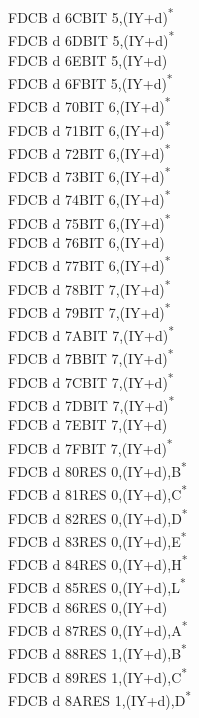 \documentclass[twoside,openright,a4paper]{book}
\begin{document}
\begin{multicols}{3}
{\begin{tabbing}
	FDCB d 6C\>BIT 5,(IY+d)\textsuperscript{*}\\
	FDCB d 6D\>BIT 5,(IY+d)\textsuperscript{*}\\
	FDCB d 6E\>BIT 5,(IY+d)\\
	FDCB d 6F\>BIT 5,(IY+d)\textsuperscript{*}\\
	FDCB d 70\>BIT 6,(IY+d)\textsuperscript{*}\\
	FDCB d 71\>BIT 6,(IY+d)\textsuperscript{*}\\
	FDCB d 72\>BIT 6,(IY+d)\textsuperscript{*}\\
	FDCB d 73\>BIT 6,(IY+d)\textsuperscript{*}\\
	FDCB d 74\>BIT 6,(IY+d)\textsuperscript{*}\\
	FDCB d 75\>BIT 6,(IY+d)\textsuperscript{*}\\
	FDCB d 76\>BIT 6,(IY+d)\\
	FDCB d 77\>BIT 6,(IY+d)\textsuperscript{*}\\
	FDCB d 78\>BIT 7,(IY+d)\textsuperscript{*}\\
	FDCB d 79\>BIT 7,(IY+d)\textsuperscript{*}\\
	FDCB d 7A\>BIT 7,(IY+d)\textsuperscript{*}\\
	FDCB d 7B\>BIT 7,(IY+d)\textsuperscript{*}\\
	FDCB d 7C\>BIT 7,(IY+d)\textsuperscript{*}\\
	FDCB d 7D\>BIT 7,(IY+d)\textsuperscript{*}\\
	FDCB d 7E\>BIT 7,(IY+d)\\
	FDCB d 7F\>BIT 7,(IY+d)\textsuperscript{*}\\
	FDCB d 80\>RES 0,(IY+d),B\textsuperscript{*}\\
	FDCB d 81\>RES 0,(IY+d),C\textsuperscript{*}\\
	FDCB d 82\>RES 0,(IY+d),D\textsuperscript{*}\\
	FDCB d 83\>RES 0,(IY+d),E\textsuperscript{*}\\
	FDCB d 84\>RES 0,(IY+d),H\textsuperscript{*}\\
	FDCB d 85\>RES 0,(IY+d),L\textsuperscript{*}\\
	FDCB d 86\>RES 0,(IY+d)\\
	FDCB d 87\>RES 0,(IY+d),A\textsuperscript{*}\\
	FDCB d 88\>RES 1,(IY+d),B\textsuperscript{*}\\
	FDCB d 89\>RES 1,(IY+d),C\textsuperscript{*}\\
	FDCB d 8A\>RES 1,(IY+d),D\textsuperscript{*}\\

\end{tabbing}}
\end{multicols}
\end{document}
